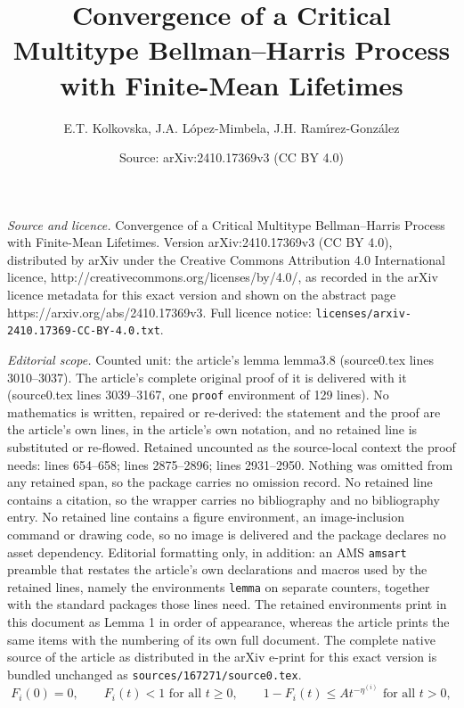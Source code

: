 \documentclass[10pt,a4paper]{amsart}
\title{Convergence of a Critical Multitype Bellman--Harris Process with Finite-Mean Lifetimes}
\author{E.T. Kolkovska, J.A. L\'{o}pez-Mimbela, J.H. Ram\'{\i}rez-Gonz\'{a}lez}
\date{Source: arXiv:2410.17369v3 (CC BY 4.0)}
\begin{document}
\maketitle

\noindent\emph{Source and licence.} Convergence of a Critical Multitype Bellman--Harris Process with Finite-Mean Lifetimes. Version arXiv:2410.17369v3 (CC BY 4.0), distributed by arXiv under the Creative Commons Attribution 4.0 International licence, http://creativecommons.org/licenses/by/4.0/, as recorded in the arXiv licence metadata for this exact version and shown on the abstract page https://arxiv.org/abs/2410.17369v3. Full licence notice: \texttt{licenses/arxiv-2410.17369-CC-BY-4.0.txt}.\par\smallskip

\noindent\textit{Editorial scope.} Counted unit: the article's lemma lemma3.8 (source0.tex lines 3010--3037). The article's complete original proof of it is delivered with it (source0.tex lines 3039--3167, one \texttt{proof} environment of 129 lines). No mathematics is written, repaired or re-derived: the statement and the proof are the article's own lines, in the article's own notation, and no retained line is substituted or re-flowed.  Retained uncounted as the source-local context the proof needs: lines 654--658; lines 2875--2896; lines 2931--2950.  Nothing was omitted from any retained span, so the package carries no omission record.  No retained line contains a citation, so the wrapper carries no bibliography and no bibliography entry.  No retained line contains a figure environment, an image-inclusion command or drawing code, so no image is delivered and the package declares no asset dependency.  Editorial formatting only, in addition: an AMS \texttt{amsart} preamble that restates the article's own declarations and macros used by the retained lines, namely the environments \texttt{lemma} on separate counters, together with the standard packages those lines need.  The retained environments print in this document as Lemma 1 in order of appearance, whereas the article prints the same items with the numbering of its own full document.  The complete native source of the article as distributed in the arXiv e-print for this exact version is bundled unchanged as \texttt{sources/167271/source0.tex}.
\begin{equation}\label{tail2}
F_i(0)=0,\qquad
F_i(t)<1 \text{ for all } t\ge0,\qquad
1-F_i(t)\le A t^{-\eta^{(i)}} \text{ for all } t>0,
\end{equation}
\end{document}
